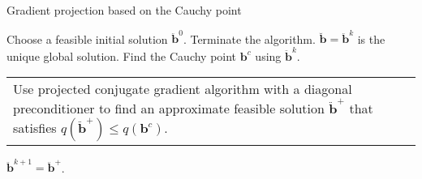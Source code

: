 \documentclass[11pt]{article}
\makeatletter
\newcommand{\0}{\phantom{0}}
\newcommand{\multiline}[1]{%
	\begin{tabularx}{\dimexpr\linewidth-\ALG@thistlm}[t]{@{}X@{}}
		#1
	\end{tabularx}
}
\makeatother
\begin{document}
%
%

\begin{algorithm}
	\caption{Gradient projection based on the Cauchy point}
	\label{alg:gradproj}
	\begin{spacing}{1.3}
		\begin{algorithmic}[1]
			\Require Choose a feasible initial solution $\ddot{\bm{b}}^{0}$. 
			\State Terminate the algorithm. $\breve{\bm{b}} = \ddot{\bm{b}}^{k}$ is the unique global solution.
			\Else {}
			\State Find the Cauchy point $\bm{b}^{c}$ using $\ddot{\bm{b}}^{k}$.
			\State \multiline{Use projected conjugate gradient algorithm with a diagonal preconditioner to find an approximate feasible solution $\ddot{\bm{b}}^{+}$ that satisfies $q(\ddot{\bm{b}}^{+}) \leq q(\bm{b}^{c})$.}
			\State $\ddot{\bm{b}}^{k+1} = \ddot{\bm{b}}^{+}$. 
			\EndIf
			\EndFor
		\end{algorithmic}
	\end{spacing}
\end{algorithm}
\end{document}
